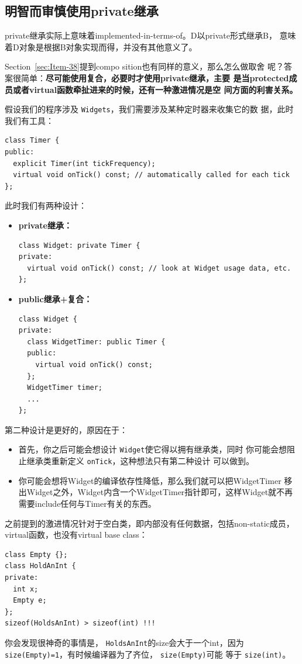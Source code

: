 \documentclass[a4paper,twoside]{article}
\theoremstyle{definition}
\theoremstyle{remark}
\numberwithin{equation}{section}
\let\OldTexttt\texttt
\renewcommand{\texttt}[1]{{\color{blue} \OldTexttt{#1}}}
\begin{document}
\subsection{明智而审慎使用private继承}
\label{sec:Item-39}

private继承实际上意味着implemented-in-terms-of。D以private形式继承B，
意味着D对象是根据B对象实现而得，并没有其他意义了。

Section~\ref{sec:Item-38}提到compo sition也有同样的意义，那么怎么做取舍
呢？答案很简单：\textbf{尽可能使用复合，必要时才使用private继承，主要
  是当protected成员或者virtual函数牵扯进来的时候，还有一种激进情况是空
  间方面的利害关系。}

假设我们的程序涉及\texttt{Widgets}，我们需要涉及某种定时器来收集它的数
据，此时我们有工具：
\begin{verbatim}
class Timer {
public:
  explicit Timer(int tickFrequency);
  virtual void onTick() const; // automatically called for each tick
};
\end{verbatim}

此时我们有两种设计：
\begin{itemize}
\item \textbf{private继承：}
\begin{verbatim}
class Widget: private Timer {
private:
  virtual void onTick() const; // look at Widget usage data, etc.
};
\end{verbatim}
\item \textbf{public继承+复合：}
\begin{verbatim}
class Widget {
private:
  class WidgetTimer: public Timer {
  public:
    virtual void onTick() const;
  };
  WidgetTimer timer;
  ...
};
\end{verbatim}
\end{itemize}

第二种设计是更好的，原因在于：
\begin{itemize}
\item 首先，你之后可能会想设计\texttt{Widget}使它得以拥有继承类，同时
  你可能会想阻止继承类重新定义\texttt{onTick}，这种想法只有第二种设计
  可以做到。
\item 你可能会想将Widget的编译依存性降低，那么我们就可以把WidgetTimer
  移出Widget之外，Widget内含一个WidgetTimer指针即可，这样Widget就不再
  需要include任何与Timer有关的东西。
\end{itemize}

之前提到的激进情况针对于空白类，即内部没有任何数据，包括non-static成员，
virtual函数，也没有virtual base class：
\begin{verbatim}
class Empty {};
class HoldAnInt {
private:
  int x;
  Empty e;
};
sizeof(HoldsAnInt) > sizeof(int) !!!
\end{verbatim}
你会发现很神奇的事情是，\texttt{HoldsAnInt}的size会大于一个int，因为
\texttt{size(Empty)=1}，有时候编译器为了齐位，\texttt{size(Empty)}可能
等于\texttt{size(int)}。
\end{document}

